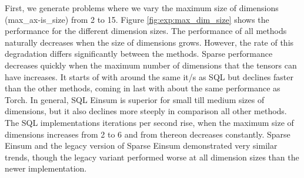 \noindent
First, we generate problems where we vary the maximum size of dimensions (max\_ax-is\_size)
from 2 to 15. Figure \ref{fig:exp:max_dim_size} shows the performance for the different
dimension sizes. The performance of all methods naturally decreases when the size of dimensions
grows. However, the rate of this degradation differs significantly between the methods.
Sparse performance decreases quickly when the maximum number of dimensions that the tensors
can have increases. It starts of with around the same it/s as SQL but declines faster than
the other methods, coming in last with about the same performance as Torch. In general,
SQL Einsum is superior for small till medium sizes of dimensions, but it also declines more
steeply in comparison all other methods. The SQL implementations iterations per second rise,
when the maximum size of dimensions increases from 2 to 6 and from thereon decreases constantly.
Sparse Einsum and the legacy version of Sparse Einsum demonstrated very similar trends,
though the legacy variant performed worse at all dimension sizes than the newer implementation.

